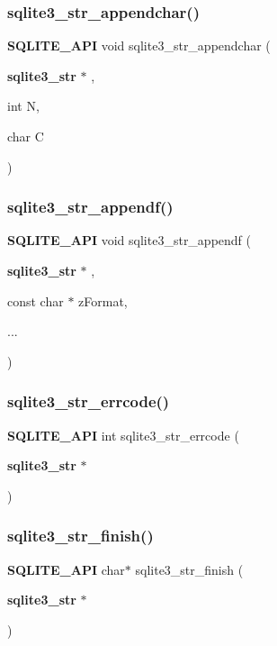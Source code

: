 \subsubsection{sqlite3\_str\_appendchar()}
{\footnotesize\ttfamily \textbf{ S\+Q\+L\+I\+T\+E\+\_\+\+A\+PI} void sqlite3\+\_\+str\+\_\+appendchar (\begin{DoxyParamCaption}\item[{\textbf{ sqlite3\+\_\+str} $\ast$}]{,  }\item[{int}]{N,  }\item[{char}]{C }\end{DoxyParamCaption})}

\mbox{\label{sqlite3_8h_aaacf2b5fa3b4c7a56b2e4b5b4e461f2a}} 
\subsubsection{sqlite3\_str\_appendf()}
{\footnotesize\ttfamily \textbf{ S\+Q\+L\+I\+T\+E\+\_\+\+A\+PI} void sqlite3\+\_\+str\+\_\+appendf (\begin{DoxyParamCaption}\item[{\textbf{ sqlite3\+\_\+str} $\ast$}]{,  }\item[{const char $\ast$}]{z\+Format,  }\item[{}]{... }\end{DoxyParamCaption})}

\mbox{\label{sqlite3_8h_a3420bd3142c53b85910935c77befeaf3}} 
\subsubsection{sqlite3\_str\_errcode()}
{\footnotesize\ttfamily \textbf{ S\+Q\+L\+I\+T\+E\+\_\+\+A\+PI} int sqlite3\+\_\+str\+\_\+errcode (\begin{DoxyParamCaption}\item[{\textbf{ sqlite3\+\_\+str} $\ast$}]{ }\end{DoxyParamCaption})}

\mbox{\label{sqlite3_8h_a8e4669abbfbf0d44be8b9666ee56382e}} 
\subsubsection{sqlite3\_str\_finish()}
{\footnotesize\ttfamily \textbf{ S\+Q\+L\+I\+T\+E\+\_\+\+A\+PI} char$\ast$ sqlite3\+\_\+str\+\_\+finish (\begin{DoxyParamCaption}\item[{\textbf{ sqlite3\+\_\+str} $\ast$}]{ }\end{DoxyParamCaption})}

